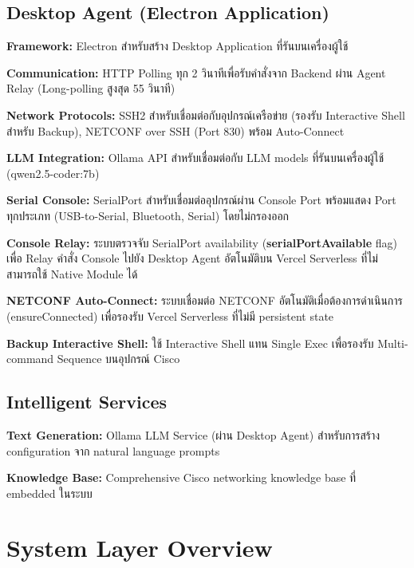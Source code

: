 \subsection{Desktop Agent (Electron Application)}
\begin{mycustomitem2}
    \item \textbf{Framework:} Electron สำหรับสร้าง Desktop Application ที่รันบนเครื่องผู้ใช้
    \item \textbf{Communication:} HTTP Polling ทุก 2 วินาทีเพื่อรับคำสั่งจาก Backend ผ่าน Agent Relay (Long-polling สูงสุด 55 วินาที)
    \item \textbf{Network Protocols:} SSH2 สำหรับเชื่อมต่อกับอุปกรณ์เครือข่าย (รองรับ Interactive Shell สำหรับ Backup), NETCONF over SSH (Port 830) พร้อม Auto-Connect
    \item \textbf{LLM Integration:} Ollama API สำหรับเชื่อมต่อกับ LLM models ที่รันบนเครื่องผู้ใช้ (qwen2.5-coder:7b)
    \item \textbf{Serial Console:} SerialPort สำหรับเชื่อมต่ออุปกรณ์ผ่าน Console Port พร้อมแสดง Port ทุกประเภท (USB-to-Serial, Bluetooth, Serial) โดยไม่กรองออก
    \item \textbf{Console Relay:} ระบบตรวจจับ SerialPort availability (\textbf{serialPortAvailable} flag) เพื่อ Relay คำสั่ง Console ไปยัง Desktop Agent อัตโนมัติบน Vercel Serverless ที่ไม่สามารถใช้ Native Module ได้
    \item \textbf{NETCONF Auto-Connect:} ระบบเชื่อมต่อ NETCONF อัตโนมัติเมื่อต้องการดำเนินการ (ensureConnected) เพื่อรองรับ Vercel Serverless ที่ไม่มี persistent state
    \item \textbf{Backup Interactive Shell:} ใช้ Interactive Shell แทน Single Exec เพื่อรองรับ Multi-command Sequence บนอุปกรณ์ Cisco
\end{mycustomitem2}

\subsection{Intelligent Services}
\begin{mycustomitem2}
    \item \textbf{Text Generation:} Ollama LLM Service (ผ่าน Desktop Agent) สำหรับการสร้าง configuration จาก natural language prompts
    \item \textbf{Knowledge Base:} Comprehensive Cisco networking knowledge base ที่ embedded ในระบบ
\end{mycustomitem2}


\section{System Layer Overview}

